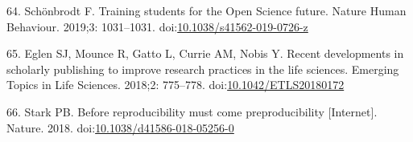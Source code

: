 \documentclass[10pt,letterpaper]{article}
\begin{document}
\leavevmode\hypertarget{ref-schonbrodt_training_2019}{}%
64. Schönbrodt F. Training students for the Open Science future. Nature
Human Behaviour. 2019;3: 1031--1031.
doi:\href{https://doi.org/10.1038/s41562-019-0726-z}{10.1038/s41562-019-0726-z}

\leavevmode\hypertarget{ref-eglen_recent_2018}{}%
65. Eglen SJ, Mounce R, Gatto L, Currie AM, Nobis Y. Recent developments
in scholarly publishing to improve research practices in the life
sciences. Emerging Topics in Life Sciences. 2018;2: 775--778.
doi:\href{https://doi.org/10.1042/ETLS20180172}{10.1042/ETLS20180172}

\leavevmode\hypertarget{ref-stark_before_2018}{}%
66. Stark PB. Before reproducibility must come preproducibility
{[}Internet{]}. Nature. 2018.
doi:\href{https://doi.org/10.1038/d41586-018-05256-0}{10.1038/d41586-018-05256-0}

\nolinenumbers
\end{document}
